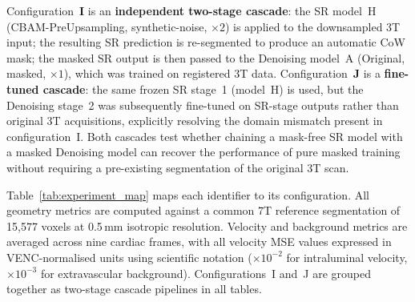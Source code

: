 \documentclass[11pt]{article}
\begin{document}
Configuration~\textbf{I} is an \textbf{independent two-stage cascade}: the SR model~H
(CBAM-PreUpsampling, synthetic-noise, $\times 2$) is applied to the downsampled 3T input;
the resulting SR prediction is re-segmented to produce an automatic CoW mask; the masked SR
output is then passed to the Denoising model~A (Original, masked, $\times 1$), which was trained
on registered 3T data.  Configuration~\textbf{J} is a \textbf{fine-tuned cascade}: the same
frozen SR stage~1 (model~H) is used, but the Denoising stage~2 was subsequently fine-tuned on
SR-stage outputs rather than original 3T acquisitions, explicitly resolving the domain mismatch
present in configuration~I.  Both cascades test whether chaining a mask-free SR model with a
masked Denoising model can recover the performance of pure masked training without requiring a
pre-existing segmentation of the original 3T scan.

Table~\ref{tab:experiment_map} maps each identifier to its configuration.  All geometry metrics
are computed against a common 7T reference segmentation of 15{,}577 voxels at 0.5\,mm isotropic
resolution.  Velocity and background metrics are averaged across nine cardiac frames, with all
velocity MSE values expressed in VENC-normalised units using scientific notation ($\times 10^{-2}$
for intraluminal velocity, $\times 10^{-3}$ for extravascular background).  Configurations~I
and~J are grouped together as two-stage cascade pipelines in all tables.
\end{document}
